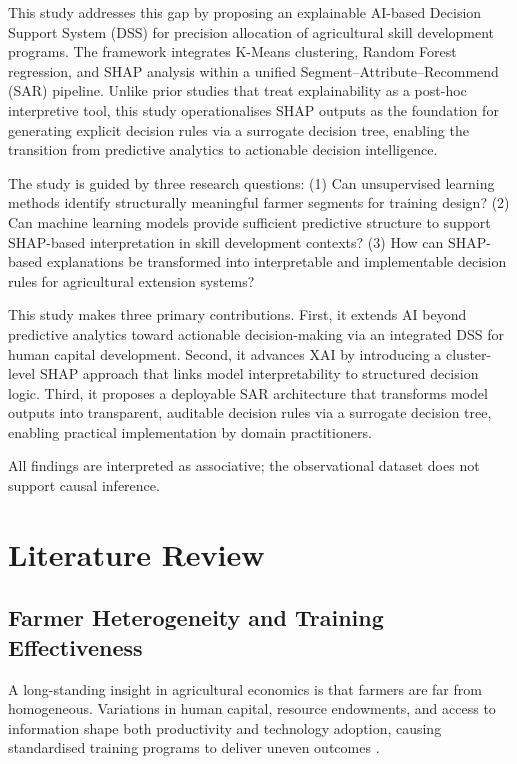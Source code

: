 \documentclass[3p,twocolumn,authoryear]{elsarticle}
\begin{document}
This study addresses this gap by proposing an explainable
AI-based Decision Support System (DSS) for precision allocation of
agricultural skill development programs.
The framework integrates K-Means clustering, Random Forest
regression, and SHAP analysis within a unified
Segment--Attribute--Recommend (SAR) pipeline.
Unlike prior studies that treat explainability as a post-hoc
interpretive tool, this study operationalises SHAP outputs as the
foundation for generating explicit decision rules via a surrogate
decision tree, enabling the transition from predictive analytics
to actionable decision intelligence.

The study is guided by three research questions:
(1) Can unsupervised learning methods identify structurally
meaningful farmer segments for training design?
(2) Can machine learning models provide sufficient predictive
structure to support SHAP-based interpretation in skill development
contexts?
(3) How can SHAP-based explanations be transformed into
interpretable and implementable decision rules for agricultural
extension systems?

This study makes three primary contributions.
First, it extends AI beyond predictive analytics toward actionable
decision-making via an integrated DSS for human capital development.
Second, it advances XAI by introducing a cluster-level SHAP approach
that links model interpretability to structured decision logic.
Third, it proposes a deployable SAR architecture that transforms
model outputs into transparent, auditable decision rules via a
surrogate decision tree, enabling practical implementation by
domain practitioners.

All findings are interpreted as associative; the observational
dataset does not support causal inference.

\section{Literature Review}

\subsection{Farmer Heterogeneity and Training Effectiveness}

A long-standing insight in agricultural economics is that farmers
are far from homogeneous.
Variations in human capital, resource endowments, and access to
information shape both productivity and technology adoption, causing
standardised training programs to deliver uneven outcomes
\citep{feder1985}.
\end{document}
